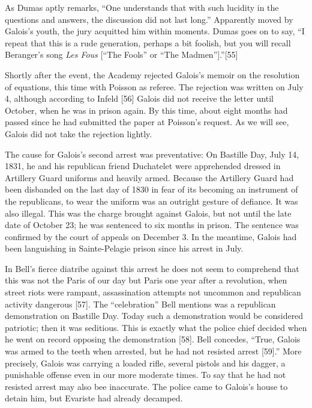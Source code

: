 \documentclass[12pt]{article}
\begin{document}
As Dumas aptly remarks, ``One understands that with such lucidity in the questions and answers, the discussion did not last long.'' Apparently moved by Galois's youth, the jury acquitted him within moments. Dumas goes on to say, ``I repeat that this is a rude generation, perhaps a bit foolish, but you will recall Beranger's song \emph{Les Fous} [``The Fools'' or ``The Madmen''].''[55]

Shortly after the event, the Academy rejected Galois's memoir on the resolution of equations, this time with Poisson as referee. The rejection was written on July 4, although according to Infeld [56] Galois did not receive the letter until October, when he was in prison again. By this time, about eight months had passed since he had submitted the paper at Poisson's request. As we will see, Galois did not take the rejection lightly.

The cause for Galois's second arrest was preventative: On Bastille Day, July 14, 1831, he and his republican friend Duchatelet were apprehended dressed in Artillery Guard uniforms and heavily armed. Because the Artillery Guard had been disbanded on the last day of 1830 in fear of its becoming an instrument of the republicans, to wear the uniform was an outright gesture of defiance. It was also illegal. This was the charge brought against Galois, but not until the late date of October 23; he was sentenced to six months in prison. The sentence was confirmed by the court of appeals on December 3. In the meantime, Galois had been languishing in Sainte-Pelagie prison since his arrest in July.

In Bell's fierce diatribe against this arrest he does not seem to comprehend that this was not the Paris of our day but Paris one year after a revolution, when street riots were rampant, assassination attempts not uncommon and republican activity dangerous [57]. The ``celebration'' Bell mentions was a republican demonstration on Bastille Day. Today such a demonstration would be considered patriotic; then it was seditious. This is exactly what the police chief decided when he went on record opposing the demonstration [58]. Bell concedes, ``True, Galois was armed to the teeth when arrested, but he had not resisted arrest [59].''  More precisely, Galois was carrying a loaded rifle, several pistols and his dagger, a punishable offense even in our more moderate times. To say that he had not resisted arrest may also bee inaccurate. The police came to Galois's house to detain him, but Evariste had already decamped.
\end{document}
